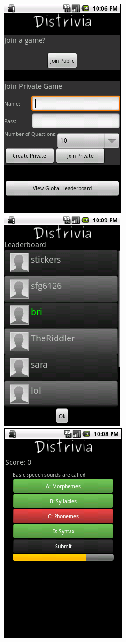 \documentclass{dependencies/acm_proc_article-sp}
\begin{document}
\begin{figure}[h!]
   \includegraphics[scale=0.32]{android/join.png}
   \includegraphics[scale=0.32]{android/lb.png}
   \includegraphics[scale=0.32]{android/answer2.png}

\end{figure}
\end{document}
